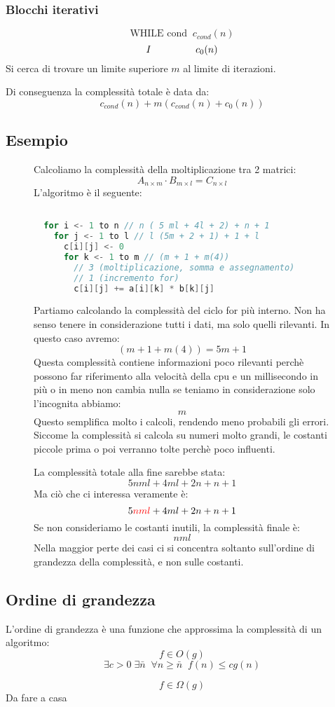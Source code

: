 \documentclass[a4paper]{article}
\theoremstyle{break}
\theoremstyle{break}
\theoremstyle{break}
\theoremstyle{break}
\begin{document}
\subsubsection{Blocchi iterativi}
\[
  \text{WHILE cond} \;\; c_{cond}(n)
\] 
\[
  I \hspace{1.6cm} c_0(n)
\] 
Si cerca di trovare un limite superiore \( m \) al limite di iterazioni.

\vspace{1em}
\noindent
Di conseguenza la complessità totale è data da:
\[
  c_{cond}(n) + m(c_{cond}(n) + c_0(n))
\]

\subsection{Esempio}
\begin{figure}[H]
  \begin{example}
    Calcoliamo la complessità della moltiplicazione tra 2 matrici:
    \[
      A_{n \times m} \cdot B_{m \times l} = C_{n \times l}
    \] 
    L'algoritmo è il seguente:
    \begin{lstlisting}[language=Scala]

  for i <- 1 to n // n ( 5 ml + 4l + 2) + n + 1
    for j <- 1 to l // l (5m + 2 + 1) + 1 + l 
      c[i][j] <- 0
      for k <- 1 to m // (m + 1 + m(4))
        // 3 (moltiplicazione, somma e assegnamento)
        // 1 (incremento for) 
        c[i][j] += a[i][k] * b[k][j]
    \end{lstlisting}

    \noindent
    Partiamo calcolando la complessità del ciclo for più interno. Non ha
    senso tenere in considerazione tutti i dati, ma solo quelli rilevanti. In
    questo caso avremo:
    \[
      (m + 1 + m(4)) = 5m + 1
    \] 
    Questa complessità contiene informazioni poco rilevanti perchè possono far
    riferimento alla velocità della cpu e un millisecondo in più o in meno non cambia
    nulla se teniamo in considerazione solo l'incognita abbiamo:
    \[
      m
    \]
    Questo semplifica molto i calcoli, rendendo meno probabili gli errori. Siccome
    la complessità si calcola su numeri molto grandi, le costanti piccole prima o poi
    verranno tolte perchè poco influenti.

    \vspace{1em}
    \noindent
    La complessità totale alla fine sarebbe stata:
    \[
      5nml+4ml+2n+n+1
    \] 
    Ma ciò che ci interessa veramente è:
    \[
      5\color{red}nml\color{black}+4ml+2n+n+1
    \] 
    Se non consideriamo le costanti inutili, la complessità finale è:
    \[
      nml
    \]
    Nella maggior perte dei casi ci si concentra soltanto sull'ordine di grandezza
    della complessità, e non sulle costanti.
  \end{example}
\end{figure}

\subsection{Ordine di grandezza}
L'ordine di grandezza è una funzione che approssima la complessità di un algoritmo:
\[
f \in O(g)
\] 
\[
  \exists c > 0\; \exists \bar{n}\;\; \forall n \ge \bar{n}\;\; f(n) \le c g(n)
\] 
\label{07-10-D1}

\[
f \in \Omega(g)
\] 
Da fare a casa
\end{document}
